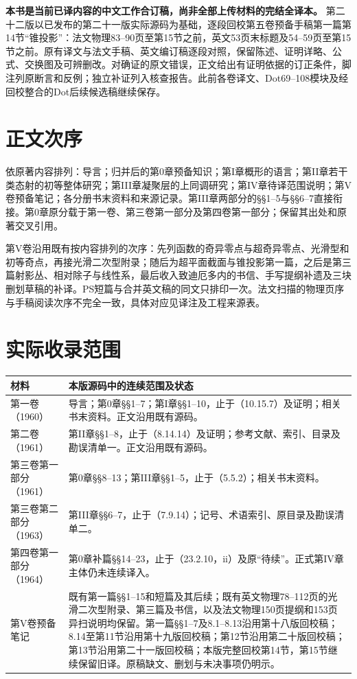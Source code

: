 \maketitle
{}
\noindent\textbf{本书是当前已译内容的中文工作合订稿，尚非全部上传材料的完结全译本。}
第二十二版以已发布的第二十一版实际源码为基础，逐段回校第五卷预备手稿第一篇第14节“锥投影”：法文物理83--90页至第15节之前，英文53页末标题及54--59页至第15节之前。原有译文与法文手稿、英文编订稿逐段对照，保留陈述、证明详略、公式、交换图及可辨删改。对确证的原文错误，正文给出有证明依据的订正条件，脚注列原断言和反例；独立补证列入核查报告。此前各卷译文、Dot69--108模块及经回校整合的Dot后续候选稿继续保存。

\section*{正文次序}
依原著内容排列：导言；归并后的第0章预备知识；第I章概形的语言；第II章若干类态射的初等整体研究；第III章凝聚层的上同调研究；第IV章待译范围说明；第V卷预备笔记；各分册书末资料和来源记录。第III章两部分的§§1--5与§§6--7直接衔接。第0章原分载于第一卷、第三卷第一部分及第四卷第一部分；保留其出处和原著交叉引用。

第V卷沿用既有按内容排列的次序：先列函数的奇异零点与超奇异零点、光滑型和初等奇点，再接光滑二次型附录；随后为超平面截面与锥投影第一篇，之后是第三篇射影丛、相对除子与线性系，最后收入致迪厄多内的书信、手写提纲补遗及三块删划草稿的补译。PS短篇与合并英文稿的同文只排印一次。法文扫描的物理页序与手稿阅读次序不完全一致，具体对应见译注及工程来源表。

\clearpage
\section*{实际收录范围}
\begin{longtable}{@{}p{.25\linewidth}p{.67\linewidth}@{}}
\toprule 材料&本版源码中的连续范围及状态\\\midrule\endhead
第一卷（1960）&导言；第0章§§1--7；第I章§§1--10，止于（10.15.7）及证明；相关书末资料。正文沿用既有源码。\\
第二卷（1961）&第II章§§1--8，止于（8.14.14）及证明；参考文献、索引、目录及勘误清单一。正文沿用既有源码。\\
第三卷第一部分（1961）&第0章§§8--13；第III章§§1--5，止于（5.5.2）；相关书末资料。\\
第三卷第二部分（1963）&第III章§§6--7，止于（7.9.14）；记号、术语索引、原目录及勘误清单二。\\
第四卷第一部分（1964）&第0章补篇§§14--23，止于（23.2.10，ii）及原“待续”。正式第IV章主体仍未连续译入。\\
第V卷预备笔记&既有第一篇§§1--15和短篇及其后续；既有英文物理78--112页的光滑二次型附录、第三篇及书信，以及法文物理150页提纲和153页异扫说明均保留。第一篇§§1--7及8.1--8.13沿用第十八版回校稿；8.14至第11节沿用第十九版回校稿；第12节沿用第二十版回校稿；第13节沿用第二十一版回校稿；本版完整回校第14节，第15节继续保留旧译。原稿缺文、删划与未决事项仍明示。\\
\bottomrule
\end{longtable}

